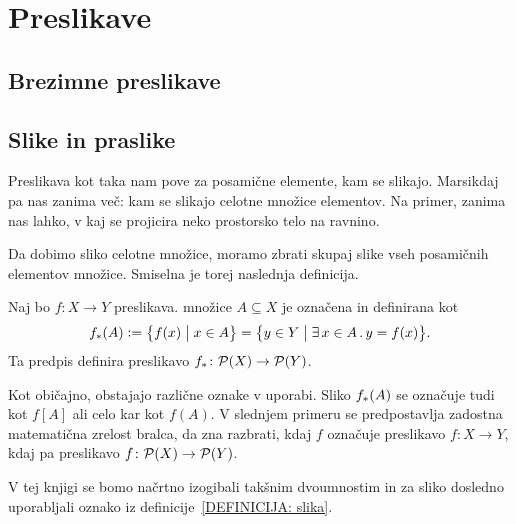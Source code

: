 \chapter{Preslikave}

	
	
	\section{Brezimne preslikave}\label{RAZDELEK: Brezimne preslikave}
	
	
	
	\section{Slike in praslike}
	
		Preslikava kot taka nam pove za posamične elemente, kam se slikajo. Marsikdaj pa nas zanima več: kam se slikajo celotne množice elementov. Na primer, zanima nas lahko, v kaj se projicira neko prostorsko telo na ravnino.
		
		
		Da dobimo sliko celotne množice, moramo zbrati skupaj slike vseh posamičnih elementov množice. Smiselna je torej naslednja definicija.
		
		\begin{definicija}\label{DEFINICIJA: slika}
			Naj bo $f\colon X \to Y$ preslikava.  množice $A \subseteq X$ je označena in definirana kot
			\[\img{f}{A} \dfeq \set[1]{f(x)}{x \in A} = \set[1]{y \in Y}{\xsome{x}[A]{y = f(x)}}.\]
			Ta predpis definira preslikavo $\img{f}\colon \pst(X) \to \pst(Y)$.
		\end{definicija}
		
		\begin{opomba}
			Kot običajno, obstajajo različne oznake v uporabi. Sliko $\img{f}{A}$ se označuje tudi kot $f[A]$ ali celo kar kot $f(A)$. V slednjem primeru se predpostavlja zadostna matematična zrelost bralca, da zna razbrati, kdaj $f$ označuje preslikavo $f\colon X \to Y$, kdaj pa preslikavo $f\colon \mathcal{P}(X) \to \mathcal{P}(Y)$.
			
			V tej knjigi se bomo načrtno izogibali takšnim dvoumnostim in za sliko dosledno uporabljali oznako iz definicije~\ref{DEFINICIJA: slika}.
		\end{opomba}
		

